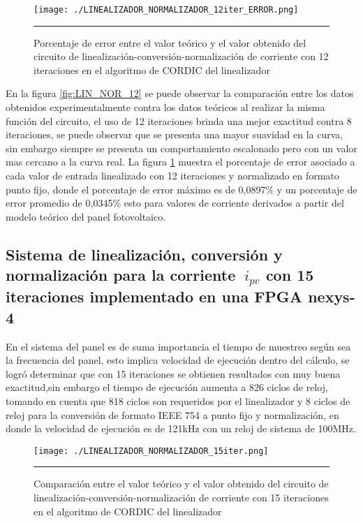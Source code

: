 \begin{figure}[H]
  \centering
    \texttt{[image: ./LINEALIZADOR\_NORMALIZADOR\_12iter\_ERROR.png]}
    \rule{35em}{0.5pt}
  \caption[Porcentaje de error entre el valor teórico y el valor obtenido del circuito de linealización-conversión-normalización de corriente con 12 iteraciones en el algoritmo de CORDIC del linealizador]{Porcentaje de error entre el valor teórico y el valor obtenido del circuito de linealización-conversión-normalización de corriente con 12 iteraciones en el algoritmo de CORDIC del linealizador}
  \label{fig:LIN_NOR_12_E}
\end{figure}

En la figura \ref{fig:LIN_NOR_12} se puede observar la comparación entre los datos obtenidos experimentalmente contra los datos teóricos al realizar la misma función del circuito, el uso de 12 iteraciones brinda una mejor exactitud contra 8 iteraciones, se puede observar que se presenta una mayor suavidad en la curva, sin embargo siempre se presenta un comportamiento escalonado pero con un valor mas cercano a la curva real. La figura \ref{fig:LIN_NOR_12_E} muestra el porcentaje de error asociado a cada valor de entrada linealizado con 12 iteraciones y normalizado en formato punto fijo, donde el porcentaje de error máximo es de 0,0897\% y un porcentaje de error promedio de 0,0345\% esto para valores de corriente derivados a partir del modelo teórico del panel fotovoltaico.


\subsection{Sistema de linealización, conversión y normalización para la corriente $\ i_{pv}$ con 15 iteraciones implementado en una FPGA nexys-4} 

En el sistema del panel es de suma importancia el tiempo de muestreo según sea la frecuencia del panel, esto implica velocidad de ejecución dentro del cálculo, se logró determinar que con 15 iteraciones se obtienen resultados con muy buena exactitud,sin embargo el tiempo de ejecución aumenta a 826 ciclos de reloj, tomando en cuenta que 818 ciclos son requeridos por el linealizador y 8 ciclos de reloj para la conversión de formato IEEE 754 a punto fijo y normalización, en donde la velocidad de ejecución es de 121kHz con un reloj de sistema de 100MHz.  


\begin{figure}[H]
  \centering
    \texttt{[image: ./LINEALIZADOR\_NORMALIZADOR\_15iter.png]}
    \rule{35em}{0.5pt}
  \caption[Comparación entre el valor teórico y el valor obtenido del circuito de linealización-conversión-normalización de corriente con 15 iteraciones en el algoritmo de CORDIC del linealizador]{Comparación entre el valor teórico y el valor obtenido del circuito de linealización-conversión-normalización de corriente con 15 iteraciones en el algoritmo de CORDIC del linealizador}
  \label{fig:LIN_NOR_15}
\end{figure}

